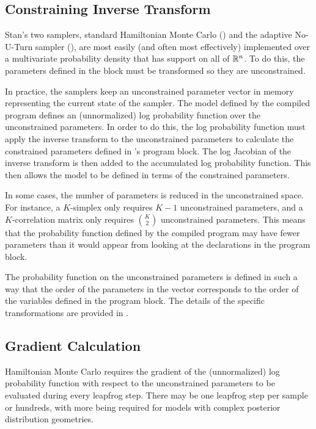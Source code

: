 \subsection{Constraining Inverse Transform}

Stan's two samplers, standard Hamiltonian Monte Carlo (\HMC) and the
adaptive No-U-Turn sampler (\NUTS), are most easily (and often most
effectively) implemented over a multivariate probability density that
has support on all of $\mathbb{R}^n$.  To do this, the parameters
defined in the  block must be transformed so they are
unconstrained. 

In practice, the samplers keep an unconstrained parameter vector in
memory representing the current state of the sampler.  The model
defined by the compiled \Stan program defines an (unnormalized) log
probability function over the unconstrained parameters.  In order to
do this, the log probability function must apply the inverse transform
to the unconstrained parameters to calculate the constrained
parameters defined in \Stan's  program block.  The
log Jacobian of the inverse transform is then added to the accumulated
log probability function.  This then allows the \Stan model to be
defined in terms of the constrained parameters.

In some cases, the number of parameters is reduced in the
unconstrained space.  For instance, a $K$-simplex only requires $K-1$
unconstrained parameters, and a $K$-correlation matrix only requires
${K \choose 2}$ unconstrained parameters.  This means that the
probability function defined by the compiled \Stan program may have
fewer parameters than it would appear from looking at the declarations
in the  program block. 

The probability function on the unconstrained parameters is defined in
such a way that the order of the parameters in the vector corresponds
to the order of the variables defined in the  program
block.  The details of the specific transformations are provided in
.

\subsection{Gradient Calculation}

Hamiltonian Monte Carlo requires the gradient of the (unnormalized)
log probability function with respect to the unconstrained parameters
to be evaluated during every leapfrog step.  There may be one leapfrog
step per sample or hundreds, with more being required for models with
complex posterior distribution geometries.

